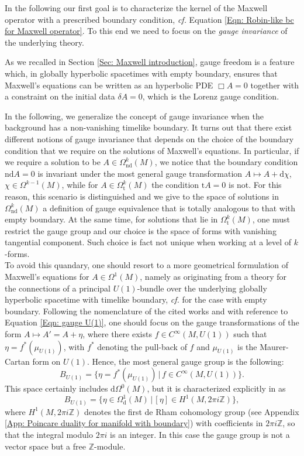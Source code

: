 In the following our first goal is to characterize the kernel of the Maxwell operator with a prescribed boundary condition, {\it cf.} Equation \eqref{Eqn: Robin-like bc for Maxwell operator}. To this end we need to focus on the {\em gauge invariance} of the underlying theory.

As we recalled in Section \ref{Sec: Maxwell introduction}, gauge freedom is a feature which, in globally hyperbolic spacetimes with empty boundary, ensures that Maxwell's equations can be written as an hyperbolic PDE $\Box A=0$ together with a constraint on the initial data $\delta A=0$, which is the Lorenz gauge condition.

In the following, we generalize the concept of gauge invariance when the background has a non-vanishing timelike boundary. It turns out that there exist different notions of gauge invariance that depends on the choice of the boundary condition that we require on the solutions of Maxwell's equations. In particular, if we require a solution to be $A\in\Omega_{\mathrm{nd}}^k(M)$, we notice that the boundary condition $\mathrm{nd}A=0$ is invariant under the most general gauge transformation $A\mapsto A+\mathrm{d}\chi$, $\chi\in\Omega^{k-1}(M)$, while for $A\in\Omega_{\mathrm{t}}^k(M)$ the condition $\mathrm{t}A=0$ is not. For this reason, this scenario is distinguished and we give to the space of solutions in $\Omega_{\mathrm{nd}}^k(M)$ a definition of gauge equivalence that is totally analogous to that with empty boundary. At the same time, for solutions that lie in $\Omega_{\mathrm{t}}^k(M)$, one must restrict the gauge group and our choice is the space of forms with vanishing tangential component. Such choice is fact not unique when working at a level of $k$-forms.\\

To avoid this quandary, one should resort to a more geometrical formulation of Maxwell's equations for $A\in \Omega^1(M)$, namely as originating from a theory for the connections of a principal $U(1)$-bundle over the underlying globally hyperbolic spacetime with timelike boundary, {\it cf.} \cite{Benini-Dappiaggi-Hack-Schenkel-14,Benini:2013tra} for the case with empty boundary. Following the nomenclature of the cited works and with reference to Equation \eqref{Eqn: gauge U(1)}, one should focus on the gauge transformations of the form $A\mapsto A'=A+\eta$, where there exists $f\in C^\infty (M,U(1))$ such that $\eta=f^*(\mu_{U(1)})$, with $f^*$ denoting the pull-back of $f$ and $\mu_{U(1)}$ is the Maurer-Cartan form on $U(1)$. Hence, the most general gauge group is the following:
\[	B_{U(1)}=\{	\eta=f^*(\mu_{U(1)})\,|\, f\in C^\infty (M,U(1))	\}.		\]
This space certainly includes $\mathrm{d}\Omega^0(M)$, but it is characterized explicitly in \cite{Benini-Dappiaggi-Hack-Schenkel-14} as 
\[	B_{U(1)}=\{	\eta\in \Omega_{\mathrm{d}}^1(M)\,|\, [\eta]\in H^1(M,2\pi i\mathbb{Z})    \},		\]
where $H^1(M,2\pi i\mathbb{Z})$ denotes the first de Rham cohomology group (see Appendix \ref{App: Poincare duality for manifold with boundary}) with coefficients in $2\pi i\mathbb{Z}$, so that the integral modulo $2\pi i$ is an integer. In this case the gauge group is not a vector space but a free $\mathbb{Z}$-module.

